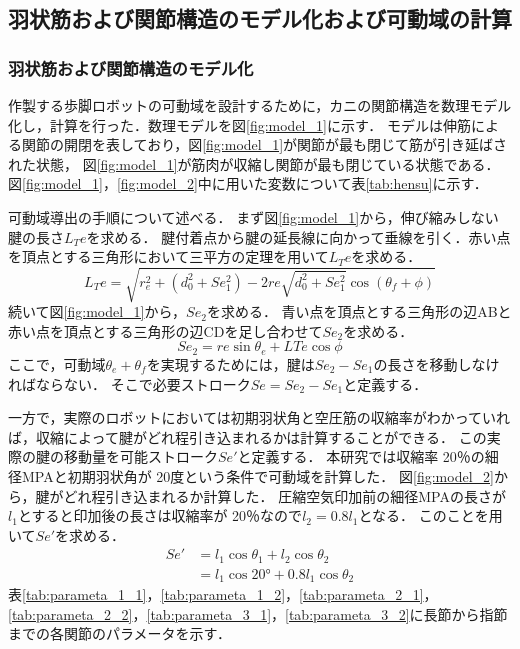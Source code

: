 \subsection{羽状筋および関節構造のモデル化および可動域の計算}
\subsubsection{羽状筋および関節構造のモデル化}
作製する歩脚ロボットの可動域を設計するために，カニの関節構造を数理モデル化し，計算を行った．数理モデルを図\ref{fig:model_1}に示す．
モデルは伸筋による関節の開閉を表しており，図\ref{fig:model_1}が関節が最も閉じて筋が引き延ばされた状態，
図\ref{fig:model_1}が筋肉が収縮し関節が最も閉じている状態である．
図\ref{fig:model_1}，\ref{fig:model_2}中に用いた変数について表\ref{tab:hensu}に示す．



可動域導出の手順について述べる．
まず図\ref{fig:model_1}から，伸び縮みしない腱の長さ$L_Te$を求める．
腱付着点から腱の延長線に向かって垂線を引く．赤い点を頂点とする三角形において三平方の定理を用いて$L_Te$を求める．
\begin{equation}
  L_Te = \sqrt{r_e^2 + (d_0^2 + Se_1^2) - 2re\sqrt{d_0^2 + Se_1^2}\cos (\theta_f + \phi ) } 
\end{equation}
続いて図\ref{fig:model_1}から，$Se_2$を求める．
青い点を頂点とする三角形の辺ABと赤い点を頂点とする三角形の辺CDを足し合わせて$Se_2$を求める．
\begin{equation}
  Se_2 = re\sin \theta_e + LTe\cos \phi 
\end{equation}
ここで，可動域$\theta_e + \theta_f$を実現するためには，腱は$Se_2 - Se_1$の長さを移動しなければならない．
そこで必要ストローク$Se = Se_2 - Se_1$と定義する．

一方で，実際のロボットにおいては初期羽状角と空圧筋の収縮率がわかっていれば，収縮によって腱がどれ程引き込まれるかは計算することができる．
この実際の腱の移動量を可能ストローク$Se'$と定義する．
本研究では収縮率 20％の細径MPAと初期羽状角が 20度という条件で可動域を計算した．
図\ref{fig:model_2}から，腱がどれ程引き込まれるか計算した．
圧縮空気印加前の細径MPAの長さが$l_1$とすると印加後の長さは収縮率が 20％なので$l_2 = 0.8l_1$となる．
このことを用いて$ Se'$を求める．
\begin{equation}
  \begin {split}
  Se'  & = l_1\cos\theta_1 + l_2\cos\theta_2\\
       & = l_1\cos20° + 0.8l_1\cos\theta_2
  \end{split}
\end{equation}
表\ref{tab:parameta_1_1}，\ref{tab:parameta_1_2}，\ref{tab:parameta_2_1}，\ref{tab:parameta_2_2}，\ref{tab:parameta_3_1}，\ref{tab:parameta_3_2}に長節から指節までの各関節のパラメータを示す．

